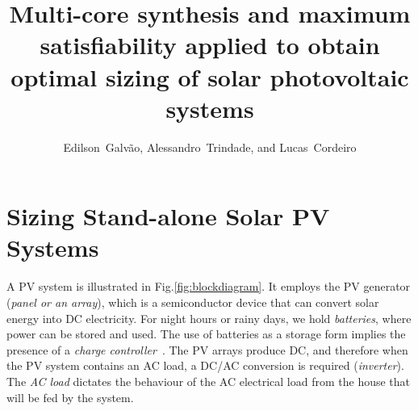 \documentclass[10pt,journal,compsoc]{IEEEtran}
\begin{document}
\title{Multi-core synthesis and maximum satisfiability applied to obtain optimal sizing of solar photovoltaic systems}
%
\author{Edilson~Galvão, Alessandro~Trindade, and Lucas~Cordeiro%
}

\maketitle

%
\IEEEpeerreviewmaketitle

\section*{Sizing Stand-alone Solar PV Systems}
\label{sec:sizing}

A PV system is illustrated in Fig.\ref{fig:blockdiagram}. It employs the PV generator (\textit{panel or an array}), which is a semiconductor device that can convert solar energy into DC electricity. For night hours or rainy days, we hold \textit{batteries}, where power can be stored and used. The use of batteries as a storage form implies the presence of a \textit{charge controller}~\cite{Hansen}. The PV arrays produce DC, and therefore when the PV system contains an AC load, a DC/AC conversion is required (\textit{inverter}). The \textit{AC load} dictates the behaviour of the AC electrical load from the house that will be fed by the system.
\end{document}
